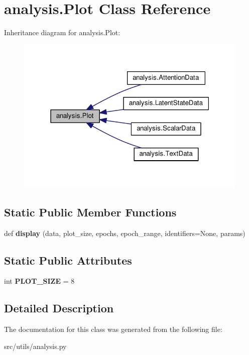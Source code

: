 \hypertarget{classanalysis_1_1Plot}{}\section{analysis.\+Plot Class Reference}
\label{classanalysis_1_1Plot}


Inheritance diagram for analysis.\+Plot\+:
\nopagebreak
\begin{figure}[H]
\begin{center}
\leavevmode
\includegraphics[width=316pt]{classanalysis_1_1Plot__inherit__graph}
\end{center}
\end{figure}
\subsection*{Static Public Member Functions}
\begin{DoxyCompactItemize}
\item 
def {\bfseries display} (data, plot\+\_\+size, epochs, epoch\+\_\+range, identifiers=None, params)\hypertarget{classanalysis_1_1Plot_ac533a92c565ab2d81e390a153551f392}{}\label{classanalysis_1_1Plot_ac533a92c565ab2d81e390a153551f392}

\end{DoxyCompactItemize}
\subsection*{Static Public Attributes}
\begin{DoxyCompactItemize}
\item 
int {\bfseries P\+L\+O\+T\+\_\+\+S\+I\+ZE} = 8\hypertarget{classanalysis_1_1Plot_a9aae3853b2723ae8934ef5123546821e}{}\label{classanalysis_1_1Plot_a9aae3853b2723ae8934ef5123546821e}

\end{DoxyCompactItemize}


\subsection{Detailed Description}
\begin{DoxyVerb}\end{DoxyVerb}
 

The documentation for this class was generated from the following file\+:\begin{DoxyCompactItemize}
\item 
src/utils/analysis.\+py\end{DoxyCompactItemize}
